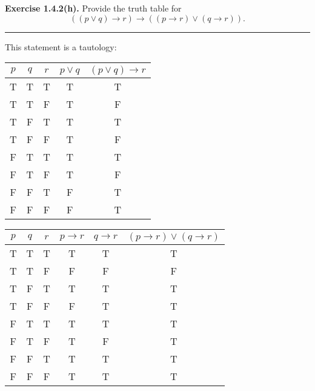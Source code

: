 \documentclass{article}
\begin{document}
\newpage{}

\noindent\textbf{Exercise 1.4.2(h).} Provide the truth table for
\[
	\left( \left( p \vee q \right) \to r \right) \to \left( \left( p \to r \right) \vee \left( q \to r \right) \right).
\]

\vspace{0.2cm}
\hrule{}
\vspace{0.2cm}

This statement is a tautology:

\begin{table}[h!]
	\begin{tabular}{ccc|cc}
		$p$ & $q$ & $r$ & $p \vee q$ & $\left( p \vee q \right) \to r$ \\ \hline
		T   & T   & T   & T          & T                               \\
		T   & T   & F   & T          & F                               \\
		T   & F   & T   & T          & T                               \\
		T   & F   & F   & T          & F                               \\
		F   & T   & T   & T          & T                               \\
		F   & T   & F   & T          & F                               \\
		F   & F   & T   & F          & T                               \\
		F   & F   & F   & F          & T                               \\
	\end{tabular}
\end{table}

\begin{table}[h!]
	\begin{tabular}{ccc|ccc}
		$p$ & $q$ & $r$ & $p \to r$ & $q \to r$ & $\left( p \to r\right ) \vee \left( q \to r \right)$ \\ \hline
		T   & T   & T   & T         & T         & T                                                    \\
		T   & T   & F   & F         & F         & F                                                    \\
		T   & F   & T   & T         & T         & T                                                    \\
		T   & F   & F   & F         & T         & T                                                    \\
		F   & T   & T   & T         & T         & T                                                    \\
		F   & T   & F   & T         & F         & T                                                    \\
		F   & F   & T   & T         & T         & T                                                    \\
		F   & F   & F   & T         & T         & T                                                    \\
	\end{tabular}
\end{table}
\end{document}
